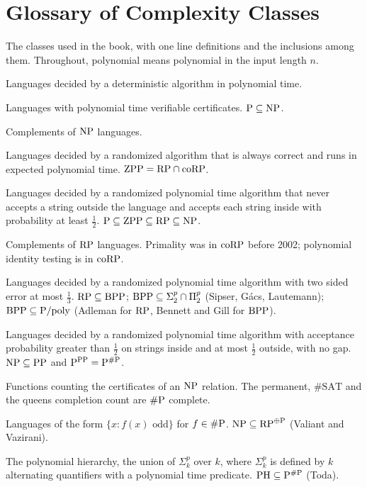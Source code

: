 \chapter{Glossary of Complexity Classes}
\label{app:glossary}

The classes used in the book, with one line definitions and the inclusions among them. Throughout, polynomial means polynomial in the input length $n$.

\begin{description}[style=nextline]
\item[$\Pc$] Languages decided by a deterministic algorithm in polynomial time.
\item[$\NP$] Languages with polynomial time verifiable certificates. $\mathrm{P} \subseteq \mathrm{NP}$.
\item[$\mathrm{co}\NP$] Complements of $\NP$ languages.
\item[$\ZPP$] Languages decided by a randomized algorithm that is always correct and runs in expected polynomial time. $\mathrm{ZPP} = \mathrm{RP} \cap \mathrm{coRP}$.
\item[$\RP$] Languages decided by a randomized polynomial time algorithm that never accepts a string outside the language and accepts each string inside with probability at least $\tfrac12$. $\mathrm{P} \subseteq \mathrm{ZPP} \subseteq \mathrm{RP} \subseteq \mathrm{NP}$.
\item[$\coRP$] Complements of $\RP$ languages. Primality was in $\coRP$ before 2002; polynomial identity testing is in $\coRP$.
\item[$\BPP$] Languages decided by a randomized polynomial time algorithm with two sided error at most $\tfrac13$. $\mathrm{RP} \subseteq \mathrm{BPP}$; $\mathrm{BPP} \subseteq \Sigma_2^p \cap \Pi_2^p$ (Sipser, G\'acs, Lautemann); $\mathrm{BPP} \subseteq \mathrm{P}/\mathrm{poly}$ (Adleman for $\RP$, Bennett and Gill for $\BPP$).
\item[$\mathrm{PP}$] Languages decided by a randomized polynomial time algorithm with acceptance probability greater than $\tfrac12$ on strings inside and at most $\tfrac12$ outside, with no gap. $\mathrm{NP} \subseteq \mathrm{PP}$ and $\mathrm{P}^{\mathrm{PP}} = \mathrm{P}^{\#\mathrm{P}}$.
\item[$\sharpP$] Functions counting the certificates of an $\NP$ relation. The permanent, $\#\mathrm{SAT}$ and the queens completion count are $\sharpP$ complete.
\item[$\oplus\Pc$] Languages of the form $\{ x : f(x) \text{ odd} \}$ for $f \in \#\mathrm{P}$. $\mathrm{NP} \subseteq \mathrm{RP}^{\oplus\mathrm{P}}$ (Valiant and Vazirani).
\item[$\PH$] The polynomial hierarchy, the union of $\Sigma_k^p$ over $k$, where $\Sigma_k^p$ is defined by $k$ alternating quantifiers with a polynomial time predicate. $\mathrm{PH} \subseteq \mathrm{P}^{\#\mathrm{P}}$ (Toda).

\end{description}
